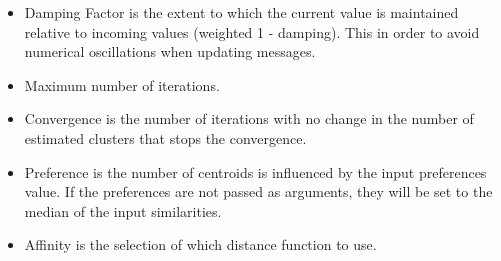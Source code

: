 \begin{itemize}

\item Damping Factor is the extent to which the current value is maintained relative to incoming values (weighted 1 - damping). This in order to avoid numerical oscillations when updating messages.

\item Maximum number of iterations.

\item Convergence is the number of iterations with no change in the number of estimated clusters that stops the convergence.

\item Preference is the number of centroids is influenced by the input preferences value. If the preferences are not passed as arguments, they will be set to the median of the input similarities.

\item Affinity is the selection of which distance function to use.


\end{itemize}

